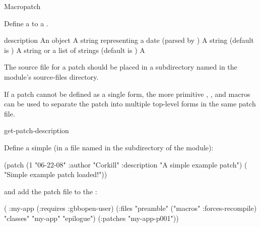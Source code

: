 \documentclass[10pt,twoside,english,pdftex]{article}
\begin{document}
\begin{functiondoc}{Macro}{patch}%
  {\code{(}
     \code{)}
    \superstar} 
%
%

\fnsyntax 

\fnpurpose Define a  to a .

\fnpackage {}

\fnmodule {}

\fnargs
\begin{args}{description}
\arg[id] An object
\arg[date] A string representing a date (parsed by 
  )
\arg[author] A string (default is )
\arg[description] A string or a list of strings (default is \nil)
\arg[form] A 
\end{args}

\fndescription 
%
The source file for a patch should be placed in a subdirectory named
 in the module's source-files directory.

If a patch cannot be defined as a single  form, the more
primitive ,
, and
 macros can be used to separate the
patch into multiple top-level forms in the same patch file.

\begin{alsos}{get-patch-description}
\also[undefmethod]
\end{alsos}

\fnexample 
%
Define a simple  (in a file named 
in the  subdirectory of the module):
%
%
%
%
\W\supp
\begin{example}
  (patch (1 "06-22-08" 
            :author "Corkill"
            :description "A simple example patch")
      ( "Simple example patch loaded!"))
\end{example}
%
and add the patch file to the  :
%
\W\supp\notpretop
\begin{example}
  ( :my-app
    (:requires :gbbopen-user)
    (:files "preamble"
            ("macros" :forces-recompile)
            "classes"
            "my-app"
            "epilogue")
    (:patches "my-app-p001"))
\end{example}

\end{functiondoc}
\end{document}
